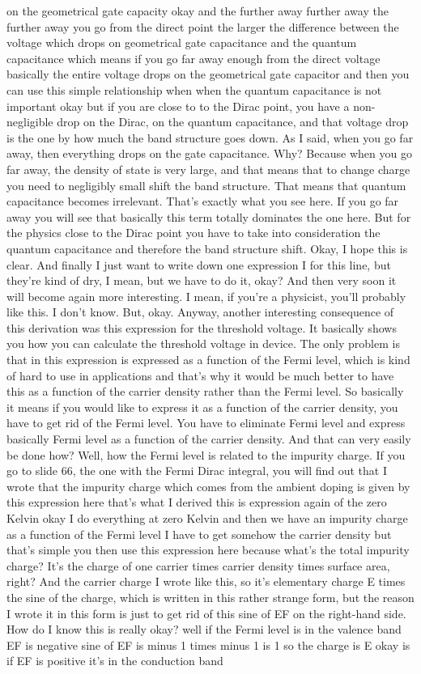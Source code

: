 on the geometrical gate capacity okay and the further away further away the further away you go from the direct point the larger the difference between the voltage which drops on geometrical gate capacitance and the quantum capacitance which means if you go far away enough from the direct voltage basically the entire voltage drops on the geometrical gate capacitor and then you can use this simple relationship when when the quantum capacitance is not important okay but if you are close to to the Dirac point, you have a non-negligible drop on the Dirac, on the quantum capacitance, and that voltage drop is the one by how much the band structure goes down. As I said, when you go far away, then everything drops on the gate capacitance. Why? Because when you go far away, the density of state is very large, and that means that to change charge you need to negligibly small shift the band structure. That means that quantum capacitance becomes irrelevant. That's exactly what you see here. If you go far away you will see that basically this term totally dominates the one here. But for the physics close to the Dirac point you have to take into consideration the quantum capacitance and therefore the band structure shift. Okay, I hope this is clear. And finally I just want to write down one expression I for this line, but they're kind of dry, I mean, but we have to do it, okay? And then very soon it will become again more interesting. I mean, if you're a physicist, you'll probably like this. I don't know. But, okay. Anyway, another interesting consequence of this derivation was this expression for the threshold voltage. It basically shows you how you can calculate the threshold voltage in device. The only problem is that in this expression is expressed as a function of the Fermi level, which is kind of hard to use in applications and that's why it would be much better to have this as a function of the carrier density rather than the Fermi level. So basically it means if you would like to express it as a function of the carrier density, you have to get rid of the Fermi level. You have to eliminate Fermi level and express basically Fermi level as a function of the carrier density. And that can very easily be done how? Well, how the Fermi level is related to the impurity charge. If you go to slide 66, the one with the Fermi Dirac integral, you will find out that I wrote that the impurity charge which comes from the ambient doping is given by this expression here that's what I derived this is expression again of the zero Kelvin okay I do everything at zero Kelvin and then we have an impurity charge as a function of the Fermi level I have to get somehow the carrier density but that's simple you then use this expression here because what's the total impurity charge? It's the charge of one carrier times carrier density times surface area, right? And the carrier charge I wrote like this, so it's elementary charge E times the sine of the charge, which is written in this rather strange form, but the reason I wrote it in this form is just to get rid of this sine of EF on the right-hand side. How do I know this is really okay? well if the Fermi level is in the valence band EF is negative sine of EF is minus 1 times minus 1 is 1 so the charge is E okay is if EF is positive it's in the conduction band 